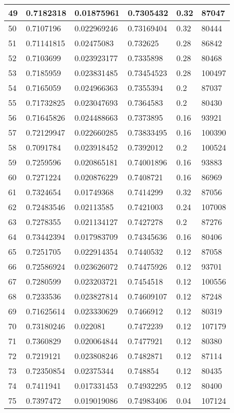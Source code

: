 \begin{longtable}{|l|l|l|l|l|l|}
49 & 0.7182318 & 0.01875961 & 0.7305432 & 0.32 & 87047 \\ \hline 
50 & 0.7107196 & 0.022969246 & 0.73169404 & 0.32 & 80444 \\ \hline 
51 & 0.71141815 & 0.02475083 & 0.732625 & 0.28 & 86842 \\ \hline 
52 & 0.7103699 & 0.023923177 & 0.7335898 & 0.28 & 80468 \\ \hline 
53 & 0.7185959 & 0.023831485 & 0.73454523 & 0.28 & 100497 \\ \hline 
54 & 0.7165059 & 0.024966363 & 0.7355394 & 0.2 & 87037 \\ \hline 
55 & 0.71732825 & 0.023047693 & 0.7364583 & 0.2 & 80430 \\ \hline 
56 & 0.71645826 & 0.024488663 & 0.7373895 & 0.16 & 93921 \\ \hline 
57 & 0.72129947 & 0.022660285 & 0.73833495 & 0.16 & 100390 \\ \hline 
58 & 0.7091784 & 0.023918452 & 0.7392012 & 0.2 & 100524 \\ \hline 
59 & 0.7259596 & 0.020865181 & 0.74001896 & 0.16 & 93883 \\ \hline 
60 & 0.7271224 & 0.020876229 & 0.7408721 & 0.16 & 86969 \\ \hline 
61 & 0.7324654 & 0.01749368 & 0.7414299 & 0.32 & 87056 \\ \hline 
62 & 0.72483546 & 0.02113585 & 0.7421003 & 0.24 & 107008 \\ \hline 
63 & 0.7278355 & 0.021134127 & 0.7427278 & 0.2 & 87276 \\ \hline 
64 & 0.73442394 & 0.017983709 & 0.74345636 & 0.16 & 80406 \\ \hline 
65 & 0.7251705 & 0.022914354 & 0.7440532 & 0.12 & 87058 \\ \hline 
66 & 0.72586924 & 0.023626072 & 0.74475926 & 0.12 & 93701 \\ \hline 
67 & 0.7280599 & 0.023203721 & 0.7454518 & 0.12 & 100556 \\ \hline 
68 & 0.7233536 & 0.023827814 & 0.74609107 & 0.12 & 87248 \\ \hline 
69 & 0.71625614 & 0.023330629 & 0.7466912 & 0.12 & 80319 \\ \hline 
70 & 0.73180246 & 0.022081 & 0.7472239 & 0.12 & 107179 \\ \hline 
71 & 0.7360829 & 0.020064844 & 0.7477921 & 0.12 & 80380 \\ \hline 
72 & 0.7219121 & 0.023808246 & 0.7482871 & 0.12 & 87114 \\ \hline 
73 & 0.72350854 & 0.02375344 & 0.748854 & 0.12 & 80435 \\ \hline 
74 & 0.7411941 & 0.017331453 & 0.74932295 & 0.12 & 80400 \\ \hline 
75 & 0.7397472 & 0.019019086 & 0.74983406 & 0.04 & 107124 \\ \hline 
\end{longtable}